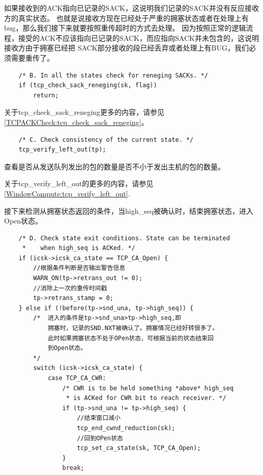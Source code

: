     如果接收到的ACK指向已记录的SACK，这说明我们记录的SACK并没有反应接收方的真实状态。
    也就是说接收方现在已经处于严重的拥塞状态或者在处理上有bug，那么我们接下来就要按照重传超时的方式去处理。
    因为按照正常的逻辑流程，接受的ACK不应该指向已记录的SACK，而应指向SACK并未包含的，这说明接收方由于拥塞已经把
    SACK部分接收的段已经丢弃或者处理上有BUG，我们必须需要重传了。
    
\begin{verbatim}
    /* B. In all the states check for reneging SACKs. */
    if (tcp_check_sack_reneging(sk, flag))
        return;
\end{verbatim}
    
    关于tcp\_check\_sack\_reneging更多的内容，请参见\ref{TCPACKCheck:tcp_check_sack_reneging}。
    
\begin{verbatim}
    /* C. Check consistency of the current state. */
    tcp_verify_left_out(tp);
\end{verbatim}

    查看是否从发送队列发出的包的数量是否不小于发出主机的包的数量。
    
    关于tcp\_verify\_left\_out的更多的内容，请参见\ref{WindowCompute:tcp_verify_left_out}.
    
    接下来检测从拥塞状态返回的条件，当high\_seq被确认时，结束拥塞状态，进入Open状态。
\begin{verbatim}
    /* D. Check state exit conditions. State can be terminated
     *    when high_seq is ACKed. */
    if (icsk->icsk_ca_state == TCP_CA_Open) {
        //根据条件判断是否输出警告信息      
        WARN_ON(tp->retrans_out != 0);
        //消除上一次的重传时间戳
        tp->retrans_stamp = 0;
    } else if (!before(tp->snd_una, tp->high_seq)) {
        /*  进入的条件是tp->snd_una>tp->high_seq,即
            拥塞时，记录的SND.NXT被确认了。拥塞情况已经好转很多了。
            此时如果拥塞状态不处于OPen状态，可根据当前的状态结束回
            到Open状态。
        */
        switch (icsk->icsk_ca_state) {
            case TCP_CA_CWR:
                /* CWR is to be held something *above* high_seq
                 * is ACKed for CWR bit to reach receiver. */
                if (tp->snd_una != tp->high_seq) {
                    //结束窗口减小                  
                    tcp_end_cwnd_reduction(sk);
                    //回到OPen状态      
                    tcp_set_ca_state(sk, TCP_CA_Open);
                }
                break;
\end{verbatim}

